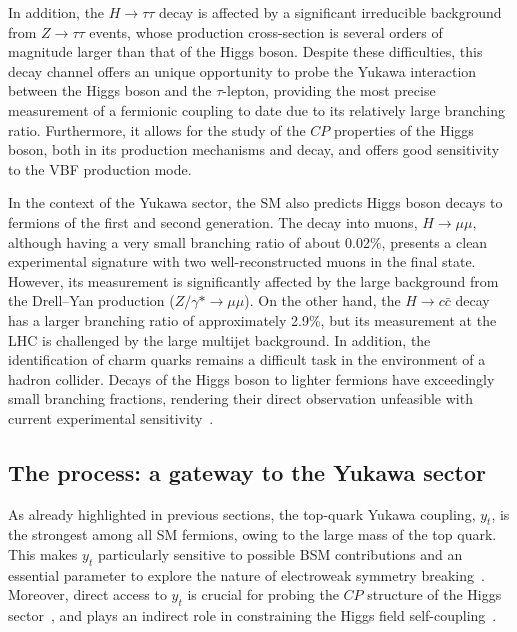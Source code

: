 In addition, the $H \rightarrow \tau\tau$ decay is affected by a significant irreducible background from $Z \rightarrow \tau\tau$ events, whose production cross-section is several orders of magnitude larger than that of the Higgs boson. Despite these difficulties, this decay channel offers an unique opportunity to probe the Yukawa interaction between the Higgs boson and the $\tau$-lepton, providing the most precise measurement of a fermionic coupling to date due to its relatively large branching ratio. Furthermore, it allows for the study of the $CP$ properties of the Higgs boson, both in its production mechanisms and decay, and offers good sensitivity to the VBF production mode.

In the context of the Yukawa sector, the SM also predicts Higgs boson decays to fermions of the first and second generation. The decay into muons, \( H \rightarrow \mu\mu \), although having a very small branching ratio of about 0.02\%, presents a clean experimental signature with two well-reconstructed muons in the final state. However, its measurement is significantly affected by the large background from the Drell--Yan production ($Z/\gamma* \to \mu \mu$). On the other hand, the \( H \rightarrow c\bar{c} \) decay has a larger branching ratio of approximately 2.9\%, but its measurement at the LHC is challenged by the large multijet background. In addition, the identification of charm quarks remains a difficult task in the environment of a hadron collider. Decays of the Higgs boson to lighter fermions have exceedingly small branching fractions, rendering their direct observation unfeasible with current experimental sensitivity~\cite{https://doi.org/10.23731/cyrm-2017-002}.

\subsection{The \ttH process: a gateway to the Yukawa sector}
\label{sec:ttH}
As already highlighted in previous sections, the top-quark Yukawa coupling, $y_t$, is the strongest among all SM fermions, owing to the large mass of the top quark. This makes $y_t$ particularly sensitive to possible BSM contributions and an essential parameter to explore the nature of electroweak symmetry breaking~\cite{Englert:2014uua,Dobrescu:1997nm,Chivukula:1998wd,Delepine:1995qs}. Moreover, direct access to $y_t$ is crucial for probing the $CP$ structure of the Higgs sector~\cite{Bernreuther:2002uj,Brod:2013cka}, and plays an indirect role in constraining the Higgs field self-coupling~\cite{Buttazzo:2013uya,Degrassi:2016wml}.

